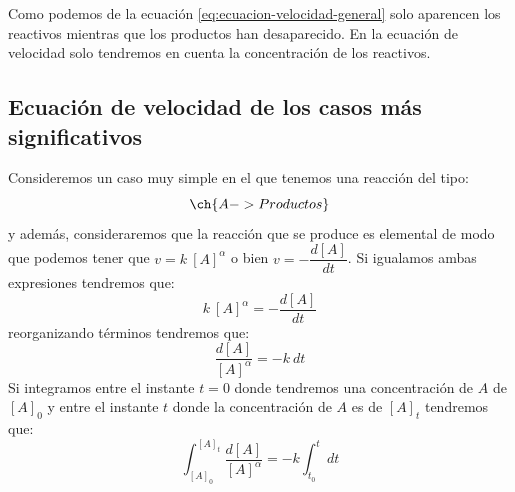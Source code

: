     Como podemos de la ecuación \eqref{eq:ecuacion-velocidad-general} solo aparencen los reactivos mientras que los productos han desaparecido.
    En la ecuación de velocidad solo tendremos en cuenta la concentración de los reactivos.

    \subsection{Ecuación de velocidad de los casos más significativos}\label{sec:casos_significativos}

    Consideremos un caso muy simple en el que tenemos una reacción del tipo:
    \begin{equation*}
        \ch{A -> Productos}
    \end{equation*}
    y además, consideraremos que la reacción que se produce es elemental de modo que podemos tener que  $v = k\ [A]^\alpha $ o bien $v = - \dfrac{d[A]}{dt}$.
    Si igualamos ambas expresiones tendremos que:
    \begin{equation*}
        k\ [A]^\alpha = - \dfrac{d[A]}{dt}
    \end{equation*}
    reorganizando términos tendremos que:
    \begin{equation*}
        \dfrac{d[A]}{[A]^\alpha} = -k\  dt
    \end{equation*}
    Si integramos entre el instante $t=0$ donde tendremos una concentración de $A$ de $[A]_0$ y entre el instante $t$ donde la concentración de $A$ es de $[A]_t$ tendremos que:
    \begin{equation*}
        \int_{[A]_0}^{[A]_t} \dfrac{d[A]}{[A]^\alpha}= -k\int_{t_0}^{t} dt
    \end{equation*}

